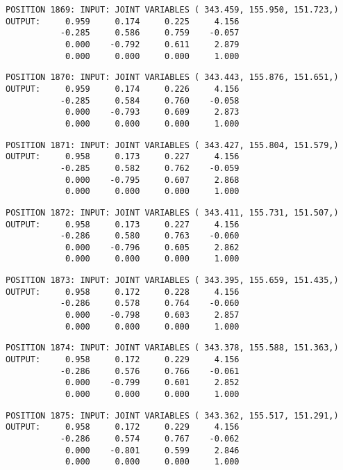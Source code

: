 \begin{verbatim}
POSITION 1869: INPUT: JOINT VARIABLES ( 343.459, 155.950, 151.723,)
OUTPUT:     0.959     0.174     0.225     4.156
           -0.285     0.586     0.759    -0.057
            0.000    -0.792     0.611     2.879
            0.000     0.000     0.000     1.000
\end{verbatim} \pagebreak[1]\begin{verbatim}
POSITION 1870: INPUT: JOINT VARIABLES ( 343.443, 155.876, 151.651,)
OUTPUT:     0.959     0.174     0.226     4.156
           -0.285     0.584     0.760    -0.058
            0.000    -0.793     0.609     2.873
            0.000     0.000     0.000     1.000
\end{verbatim} \pagebreak[1]\begin{verbatim}
POSITION 1871: INPUT: JOINT VARIABLES ( 343.427, 155.804, 151.579,)
OUTPUT:     0.958     0.173     0.227     4.156
           -0.285     0.582     0.762    -0.059
            0.000    -0.795     0.607     2.868
            0.000     0.000     0.000     1.000
\end{verbatim} \pagebreak[1]\begin{verbatim}
POSITION 1872: INPUT: JOINT VARIABLES ( 343.411, 155.731, 151.507,)
OUTPUT:     0.958     0.173     0.227     4.156
           -0.286     0.580     0.763    -0.060
            0.000    -0.796     0.605     2.862
            0.000     0.000     0.000     1.000
\end{verbatim} \pagebreak[1]\begin{verbatim}
POSITION 1873: INPUT: JOINT VARIABLES ( 343.395, 155.659, 151.435,)
OUTPUT:     0.958     0.172     0.228     4.156
           -0.286     0.578     0.764    -0.060
            0.000    -0.798     0.603     2.857
            0.000     0.000     0.000     1.000
\end{verbatim} \pagebreak[1]\begin{verbatim}
POSITION 1874: INPUT: JOINT VARIABLES ( 343.378, 155.588, 151.363,)
OUTPUT:     0.958     0.172     0.229     4.156
           -0.286     0.576     0.766    -0.061
            0.000    -0.799     0.601     2.852
            0.000     0.000     0.000     1.000
\end{verbatim} \pagebreak[1]\begin{verbatim}
POSITION 1875: INPUT: JOINT VARIABLES ( 343.362, 155.517, 151.291,)
OUTPUT:     0.958     0.172     0.229     4.156
           -0.286     0.574     0.767    -0.062
            0.000    -0.801     0.599     2.846
            0.000     0.000     0.000     1.000
\end{verbatim} \pagebreak[1]\begin{verbatim}

\end{verbatim}
